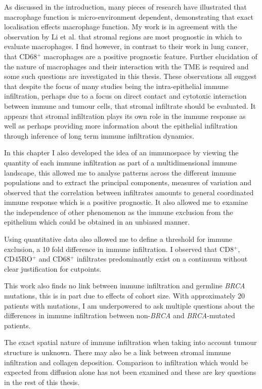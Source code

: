 As discussed in the introduction, many pieces of research have illustrated that macrophage function is micro-environment dependent\cite{ZhangMacrophage2014, li2018intratumoral}, demonstrating that exact localisation effects macrophage function. My work is in agreement with the observation by Li et al. that stromal regions are most prognostic in which to evaluate macrophages. I find however, in contrast to their work in lung cancer, that CD68$^+$ macrophages are a positive prognostic feature. Further elucidation of the nature of macrophages and their interaction with the TME is required and some such questions are investigated in this thesis.
These observations all suggest that despite the focus of many studies being the intra-epithelial immune infiltration, perhaps due to a focus on direct contact and cytotoxic interaction between immune and tumour cells, that stromal infiltrate should be evaluated. It appears that stromal infiltration plays its own role in the immune response as well as perhaps providing more information about the epithelial infiltration through inference of long term immune infiltration dynamics.

In this chapter I also developed the idea of an immunospace by viewing the quantity of each immune infiltration as part of a multidimensional immune landscape, this allowed me to analyse patterns across the different immune populations and to extract the principal components, measures of variation and observed that the correlation between infiltrates amounts to general coordinated immune response which is a positive prognostic. It also allowed me to examine the independence of other phenomenon as the immune exclusion from the epithelium which could be obtained in an unbiased manner.

Using quantitative data also allowed me to define a threshold for immune exclusion, a 10 fold difference in immune infiltration. I observed that CD8$^+$,  CD45RO$^+$ and  CD68$^+$  infiltrates predominantly exist on a continuum without clear justification for cutpoints.

This work also finds no link between immune infiltration and germline \textit{BRCA} mutations, this is in part due to effects of cohort size. With approximately 20 patients with mutations, I am underpowered to ask multiple questions about the differences in immune infiltration between non-\textit{BRCA} and \textit{BRCA}-mutated patients.

The exact spatial nature of immune infiltration when taking into account tumour structure is unknown. There may also be a link between stromal immune infiltration and collagen deposition. Comparison to infiltration which would be expected from diffusion alone has not been examined and these are key questions in the rest of this thesis.

